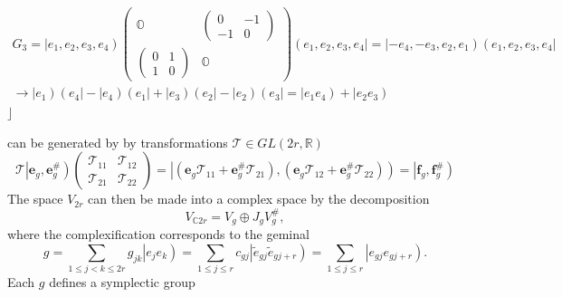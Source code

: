 \documentclass[aps,preprint]{revtex4}
\begin{document}
\begin{gather}
G_{3}=\left\vert e_{1},e_{2},e_{3},e_{4}\right) \left( 
\begin{array}{cc}
\mathbb{O} & \left( 
\begin{array}{cc}
0 & -1 \\ 
-1 & 0%
\end{array}%
\right) \\ 
\left( 
\begin{array}{cc}
0 & 1 \\ 
1 & 0%
\end{array}%
\right) & \mathbb{O}%
\end{array}%
\right) \left( e_{1},e_{2},e_{3},e_{4}\right\vert =\left\vert
-e_{4},-e_{3},e_{2},e_{1}\right) \left( e_{1},e_{2},e_{3},e_{4}\right\vert \\
\rightarrow \left\vert e_{1}\right) \left( e_{4}\right\vert -\left\vert
e_{4}\right) \left( e_{1}\right\vert +\left\vert e_{3}\right) \left(
e_{2}\right\vert -\left\vert e_{2}\right) \left( e_{3}\right\vert
=\left\vert e_{1}e_{4}\right) +\left\vert e_{2}e_{3}\right)
\end{gather}%
$\rfloor $

can be generated by by transformations $\mathcal{T}\in GL\left( 2r,\mathbb{R}%
\right) $ 
\begin{equation}
\mathcal{T}\left\vert \mathbf{e}_{g},\mathbf{e}_{g}^{\#}\right) \left( 
\begin{array}{cc}
\mathcal{T}_{11} & \mathcal{T}_{12} \\ 
\mathcal{T}_{21} & \mathcal{T}_{22}%
\end{array}%
\right) =\left\vert \left( \mathbf{e}_{g}\mathcal{T}_{11}+\mathbf{e}_{g}^{\#}%
\mathcal{T}_{21}\right) ,\left( \mathbf{e}_{g}\mathcal{T}_{12}+\mathbf{e}%
_{g}^{\#}\mathcal{T}_{22}\right) \right) =\left\vert \mathbf{f}_{g},\mathbf{f%
}_{g}^{\#}\right)
\end{equation}%
The space $V_{2r}$ can then be made into a complex space by the
decomposition 
\begin{equation}
V_{\mathbb{C}2r}=V_{g}\oplus J_{g}V_{g}^{\#},
\end{equation}%
where the complexification corresponds to the geminal 
\begin{equation}
g=\sum\limits_{1\leq j<k\leq 2r}g_{jk}\left\vert e_{j}e_{k}\right)
=\sum\limits_{1\leq j\leq r}c_{gj}\left\vert \widetilde{e}_{gj}\widetilde{e}%
_{gj+r}\right) =\sum\limits_{1\leq j\leq r}\left\vert e_{gj}e_{gj+r}\right) .
\end{equation}%
Each $g$ defines a symplectic group
\end{document}
